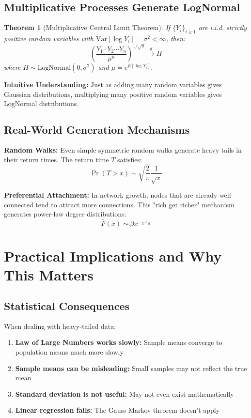 \documentclass[11pt]{article}
\newtheorem{theorem}{Theorem}
\begin{document}
\subsection{Multiplicative Processes Generate LogNormal}

\begin{theorem}[Multiplicative Central Limit Theorem]
If $\{Y_i\}_{i \geq 1}$ are i.i.d. strictly positive random variables with $\text{Var}[\log Y_i] = \sigma^2 < \infty$, then:
$$\left(\frac{Y_1 \cdot Y_2 \cdots Y_n}{\mu^n}\right)^{1/\sqrt{n}} \stackrel{d}{\to} H$$
where $H \sim \text{LogNormal}(0, \sigma^2)$ and $\mu = e^{E[\log Y_i]}$.
\end{theorem}

\textbf{Intuitive Understanding:} Just as adding many random variables gives Gaussian distributions, multiplying many positive random variables gives LogNormal distributions.

\subsection{Real-World Generation Mechanisms}

\textbf{Random Walks:} Even simple symmetric random walks generate heavy tails in their return times. The return time $T$ satisfies:
$$\Pr(T > x) \sim \sqrt{\frac{2}{\pi}} \frac{1}{\sqrt{x}}$$

\textbf{Preferential Attachment:} In network growth, nodes that are already well-connected tend to attract more connections. This "rich get richer" mechanism generates power-law degree distributions:
$$\bar{F}(x) \sim \beta x^{-\frac{1}{1-\alpha}}$$

\section{Practical Implications and Why This Matters}

\subsection{Statistical Consequences}

When dealing with heavy-tailed data:
\begin{enumerate}
\item \textbf{Law of Large Numbers works slowly:} Sample means converge to population means much more slowly
\item \textbf{Sample means can be misleading:} Small samples may not reflect the true mean
\item \textbf{Standard deviation is not useful:} May not even exist mathematically
\item \textbf{Linear regression fails:} The Gauss-Markov theorem doesn't apply
\end{enumerate}
\end{document}
